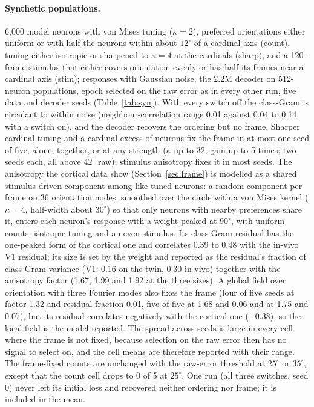 \documentclass[11pt]{article}
\begin{document}
\paragraph{Synthetic populations.} 6,000 model neurons with von Mises tuning ($\kappa = 2$), preferred orientations either uniform or with half the neurons within about $12^\circ$ of a cardinal axis (count), tuning either isotropic or sharpened to $\kappa = 4$ at the cardinals (sharp), and a 120-frame stimulus that either covers orientation evenly or has half its frames near a cardinal axis (stim); responses with Gaussian noise; the 2.2M decoder on 512-neuron populations, epoch selected on the raw error as in every other run, five data and decoder seeds (Table~\ref{tab:syn}). With every switch off the class-Gram is circulant to within noise (neighbour-correlation range 0.01 against 0.04 to 0.14 with a switch on), and the decoder recovers the ordering but no frame. Sharper cardinal tuning and a cardinal excess of neurons fix the frame in at most one seed of five, alone, together, or at any strength ($\kappa$ up to 32; gain up to 5 times; two seeds each, all above $42^\circ$ raw); stimulus anisotropy fixes it in most seeds. The anisotropy the cortical data show (Section~\ref{sec:frame}) is modelled as a shared stimulus-driven component among like-tuned neurons: a random component per frame on 36 orientation nodes, smoothed over the circle with a von Mises kernel ($\kappa = 4$, half-width about $30^\circ$) so that only neurons with nearby preferences share it, enters each neuron's response with a weight peaked at $90^\circ$, with uniform counts, isotropic tuning and an even stimulus. Its class-Gram residual has the one-peaked form of the cortical one and correlates 0.39 to 0.48 with the in-vivo V1 residual; its size is set by the weight and reported as the residual's fraction of class-Gram variance (V1: 0.16 on the twin, 0.30 in vivo) together with the anisotropy factor (1.67, 1.99 and 1.92 at the three sizes). A global field over orientation with three Fourier modes also fixes the frame (four of five seeds at factor 1.32 and residual fraction 0.01, five of five at 1.68 and 0.06 and at 1.75 and 0.07), but its residual correlates negatively with the cortical one ($-0.38$), so the local field is the model reported. The spread across seeds is large in every cell where the frame is not fixed, because selection on the raw error then has no signal to select on, and the cell means are therefore reported with their range. The frame-fixed counts are unchanged with the raw-error threshold at $25^\circ$ or $35^\circ$, except that the count cell drops to 0 of 5 at $25^\circ$. One run (all three switches, seed 0) never left its initial loss and recovered neither ordering nor frame; it is included in the mean.
\end{document}
